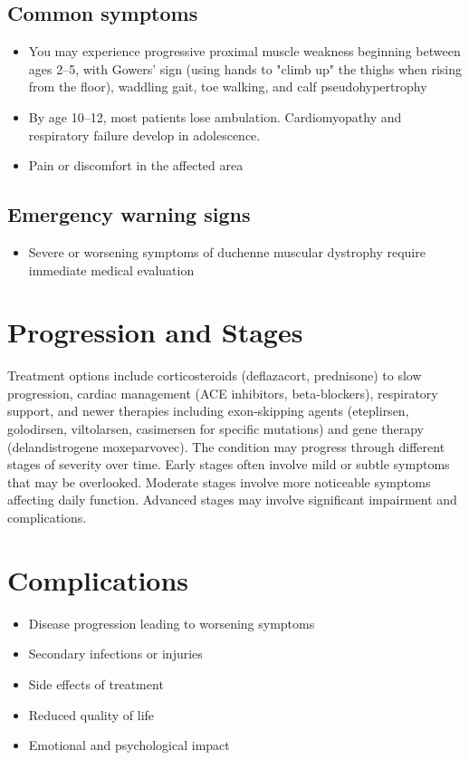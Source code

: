 \subsection{Common symptoms}
\begin{itemize}[noitemsep]
  \item You may experience progressive proximal muscle weakness beginning between ages 2--5, with Gowers' sign (using hands to "climb up" the thighs when rising from the floor), waddling gait, toe walking, and calf pseudohypertrophy
  \item By age 10--12, most patients lose ambulation. Cardiomyopathy and respiratory failure develop in adolescence.
  \item Pain or discomfort in the affected area
  \end{itemize}

\subsection{Emergency warning signs}
\begin{itemize}[noitemsep]
  \item Severe or worsening symptoms of duchenne muscular dystrophy require immediate medical evaluation
\end{itemize}
\section{Progression and Stages}
Treatment options include corticosteroids (deflazacort, prednisone) to slow progression, cardiac management (ACE inhibitors, beta-blockers), respiratory support, and newer therapies including exon-skipping agents (eteplirsen, golodirsen, viltolarsen, casimersen for specific mutations) and gene therapy (delandistrogene moxeparvovec). The condition may progress through different stages of severity over time. Early stages often involve mild or subtle symptoms that may be overlooked. Moderate stages involve more noticeable symptoms affecting daily function. Advanced stages may involve significant impairment and complications.
\section{Complications}
\begin{itemize}[noitemsep]
  \item Disease progression leading to worsening symptoms
  \item Secondary infections or injuries
  \item Side effects of treatment
  \item Reduced quality of life
  \item Emotional and psychological impact
\end{itemize}
